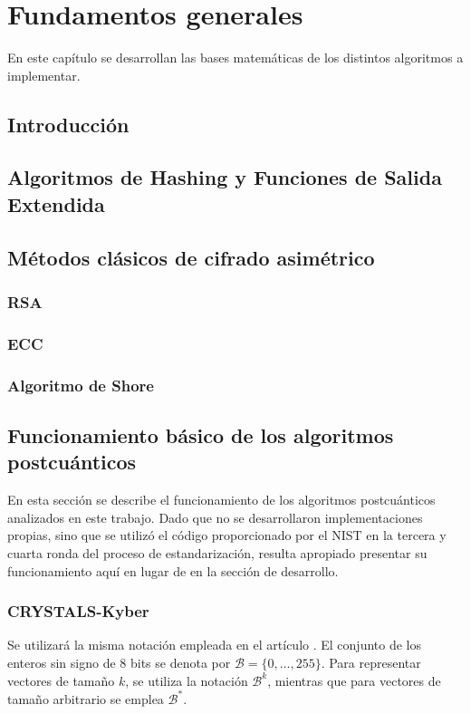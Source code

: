 \chapter{Fundamentos generales}
En este capítulo se desarrollan las bases matemáticas de los distintos algoritmos a implementar.
\section{Introducción}
\section{Algoritmos de Hashing y Funciones de Salida Extendida\cite{FIPS202}}
\section{Métodos clásicos de cifrado asimétrico}
\subsection{RSA}
\subsection{ECC}
\subsection{Algoritmo de Shore}
\newpage
\section{Funcionamiento básico de los algoritmos postcuánticos}
En esta sección se describe el funcionamiento de los algoritmos postcuánticos analizados en este trabajo. Dado que no se desarrollaron implementaciones propias, sino que se utilizó el código proporcionado por el NIST en la tercera \cite{nistPQCround3} y cuarta \cite{nistPQCround4} ronda del proceso de estandarización, resulta apropiado presentar su funcionamiento aquí en lugar de en la sección de desarrollo.
\subsection{CRYSTALS-Kyber }
Se utilizará la misma notación empleada en el artículo \cite{kyber-spec-2021}. El conjunto de los enteros sin signo de 8 bits se denota por \(\mathcal{B} = \{0, \dots, 255\}\). Para representar vectores de tamaño \(k\), se utiliza la notación \(\mathcal{B}^k\), mientras que para vectores de tamaño arbitrario se emplea \(\mathcal{B}^*\).
\newline

